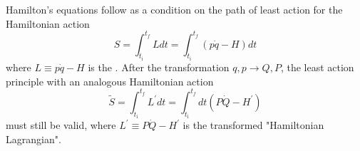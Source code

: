 Hamilton’s equations follow as a condition on the path of least action for the Hamiltonian action
\begin{equation}
S=\int_{t_{\mathrm{i}}}^{t_{f}} L d t=\int_{t_{\mathrm{i}}}^{t_{f}}(p \dot{q}-H) d t
\end{equation}
where $L \equiv p \dot{q}-H$ is the . After the transformation $q, p \rightarrow Q, P$, the least action principle with an analogous Hamiltonian action
\begin{equation}
\tilde{S}=\int_{t_{\mathrm{i}}}^{t_{f}} L^{\prime} d t=\int_{t_{\mathrm{i}}}^{t_{f}} d t\left(P \dot{Q}-H^{\prime}\right)
\end{equation}
must still be valid, where $L^{\prime} \equiv P \dot{Q}-H^{\prime}$ is the transformed "Hamiltonian Lagrangian".


